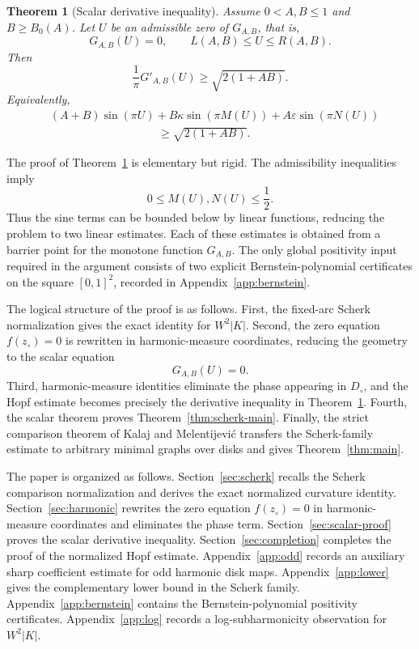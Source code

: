 \documentclass[11pt]{amsart}
\newtheorem{theorem}{Theorem}[section]
\theoremstyle{remark}
\numberwithin{equation}{section}
\begin{document}
\begin{theorem}[Scalar derivative inequality]\label{thm:scalar}
Assume \(0<A,B\leq 1\) and \(B\geq B_0(A)\).  Let \(U\) be an admissible
zero of \(G_{A,B}\), that is,
\[
        G_{A,B}(U)=0,
        \qquad
        L(A,B)\leq U\leq R(A,B).
\]
Then
\[
        \frac{1}{\pi}G'_{A,B}(U)
        \geq
        \sqrt{2(1+AB)}.
\]
Equivalently,
\[
\begin{aligned}
 &(A+B)\sin(\pi U)
        +B\kappa\sin(\pi M(U))
        +A\varepsilon\sin(\pi N(U))       \\
 &\hspace{4cm}\geq \sqrt{2(1+AB)}.
\end{aligned}
\]
\end{theorem}

The proof of Theorem~\ref{thm:scalar} is elementary but rigid.  The
admissibility inequalities imply
\[
        0\leq M(U),N(U)\leq \frac12.
\]
Thus the sine terms can be bounded below by linear functions, reducing the
problem to two linear estimates.  Each of these estimates is obtained from a
barrier point for the monotone function \(G_{A,B}\).  The only global
positivity input required in the argument consists of two explicit
Bernstein-polynomial certificates on the square \([0,1]^2\), recorded in
Appendix~\ref{app:bernstein}.

The logical structure of the proof is as follows.  First, the fixed-arc
Scherk normalization gives the exact identity for \(W^2|K|\).  Second, the
zero equation \(f(z_\circ)=0\) is rewritten in harmonic-measure coordinates,
reducing the geometry to the scalar equation
\[
        G_{A,B}(U)=0.
\]
Third, harmonic-measure identities eliminate the phase appearing in
\(D_\circ\), and the Hopf estimate becomes precisely the derivative
inequality in Theorem~\ref{thm:scalar}.  Fourth, the scalar theorem proves
Theorem~\ref{thm:scherk-main}.  Finally, the strict comparison theorem of Kalaj and Melentijevi\'c transfers
the Scherk-family estimate to arbitrary minimal graphs over disks and gives
Theorem~\ref{thm:main}.

The paper is organized as follows.  Section~\ref{sec:scherk} recalls the
Scherk comparison normalization and derives the exact normalized curvature
identity.  Section~\ref{sec:harmonic} rewrites the zero equation
\(f(z_\circ)=0\) in harmonic-measure coordinates and eliminates the phase
term.  Section~\ref{sec:scalar-proof} proves the scalar derivative
inequality.  Section~\ref{sec:completion} completes the proof of the
normalized Hopf estimate.  Appendix~\ref{app:odd} records an auxiliary sharp
coefficient estimate for odd harmonic disk maps.  Appendix~\ref{app:lower}
gives the complementary lower bound in the Scherk family.  Appendix~\ref{app:bernstein} contains the Bernstein-polynomial positivity
certificates.  Appendix~\ref{app:log} records a log-subharmonicity
observation for \(W^2|K|\).
\end{document}

